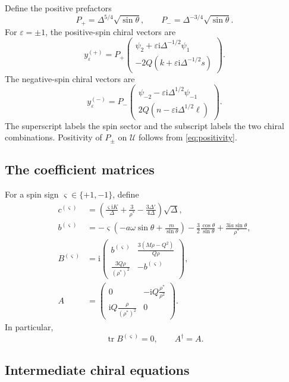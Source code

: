 \documentclass[11pt,a4paper]{article}
\numberwithin{equation}{section}
\theoremstyle{definition}
\theoremstyle{remark}
\newcommand{\I}{\mathrm i}
\newcommand{\tr}{\operatorname{tr}}
\newcommand{\Uext}{\mathcal U}
\newcommand{\mat}[1]{\begin{pmatrix}#1\end{pmatrix}}
\begin{document}
Define the positive prefactors
\begin{equation}
 P_+=\Delta^{5/4}\sqrt{\sin\theta},\qquad
 P_-=\Delta^{-3/4}\sqrt{\sin\theta}.
\label{eq:prefactors}
\end{equation}
For \(\varepsilon=\pm1\), the positive-spin chiral vectors are
\begin{equation}
 y_\varepsilon^{(+)}
 =P_+\mat{
 \psi_2+\varepsilon\I\Delta^{-1/2}\psi_1\\
 -2Q(k+\varepsilon\I\Delta^{-1/2}s)}.
\label{eq:chiral-positive}
\end{equation}
The negative-spin chiral vectors are
\begin{equation}
 y_\varepsilon^{(-)}
 =P_-\mat{
 \psi_{-2}-\varepsilon\I\Delta^{1/2}\psi_{-1}\\
 2Q(n-\varepsilon\I\Delta^{1/2}\ell)}.
\label{eq:chiral-negative}
\end{equation}
The superscript labels the spin sector and the subscript labels the two
chiral combinations.  Positivity of \(P_\pm\) on \(\Uext\) follows from
\eqref{eq:positivity}.

\subsection{The coefficient matrices}

For a spin sign \(\varsigma\in\{+1,-1\}\), define
\begin{align}
 c^{(\varsigma)}
 &=\left(\frac{\varsigma\I K}{\Delta}
 +\frac3{\rho^*}-\frac{3\Delta'}{4\Delta}\right)\sqrt{\Delta},
\label{eq:c}\\
 b^{(\varsigma)}
 &=-\varsigma\left(-a\omega\sin\theta+\frac{m}{\sin\theta}\right)
 -\frac32\frac{\cos\theta}{\sin\theta}
 +\frac{3\I a\sin\theta}{\rho^*},\nonumber\\
 B^{(\varsigma)}
 &=\I\mat{
 b^{(\varsigma)}&
 \displaystyle\frac{3(M\rho-Q^2)}{Q\rho}\\[4pt]
 \displaystyle\frac{3Q\rho}{(\rho^*)^2}&-b^{(\varsigma)}
},
\label{eq:B}\\
 A&=\mat{
 0&\displaystyle-\I Q\frac{\rho^*}{\rho^2}\\[4pt]
 \displaystyle\I Q\frac{\rho}{(\rho^*)^2}&0}.
\label{eq:A}
\end{align}
In particular,
\begin{equation}
 \tr B^{(\varsigma)}=0,\qquad A^\dagger=A.
\label{eq:trace-hermitian}
\end{equation}

\subsection{Intermediate chiral equations}
\end{document}
